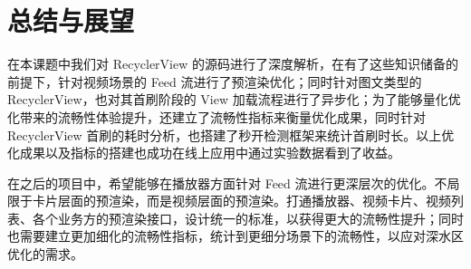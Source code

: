 \chapter{总结与展望}

在本课题中我们对 RecyclerView 的源码进行了深度解析，在有了这些知识储备的前提下，针对视频场景的 Feed 流进行了预渲染优化；同时针对图文类型的 RecyclerView，也对其首刷阶段的 View 加载流程进行了异步化；为了能够量化优化带来的流畅性体验提升，还建立了流畅性指标来衡量优化成果，同时针对 RecyclerView 首刷的耗时分析，也搭建了秒开检测框架来统计首刷时长。以上优化成果以及指标的搭建也成功在线上应用中通过实验数据看到了收益。

在之后的项目中，希望能够在播放器方面针对 Feed 流进行更深层次的优化。不局限于卡片层面的预渲染，而是视频层面的预渲染。打通播放器、视频卡片、视频列表、各个业务方的预渲染接口，设计统一的标准，以获得更大的流畅性提升；同时也需要建立更加细化的流畅性指标，统计到更细分场景下的流畅性，以应对深水区优化的需求。